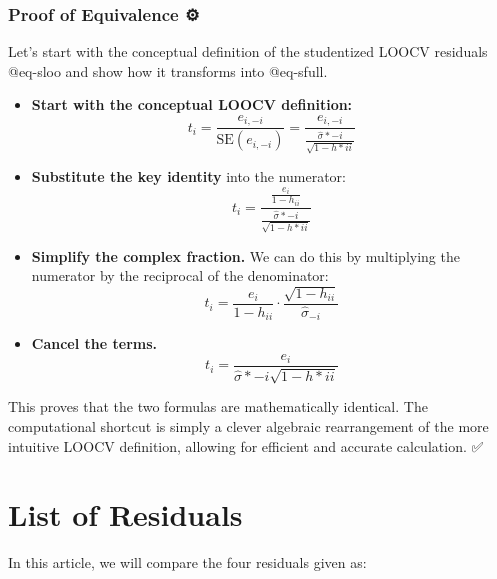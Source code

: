 \documentclass[
]{article}
\begin{document}
\subsubsection{Proof of Equivalence ⚙️}\label{proof-of-equivalence}

Let's start with the conceptual definition of the studentized LOOCV
residuals @eq-sloo and show how it transforms into @eq-sfull.

\begin{itemize}
\item
  \textbf{Start with the conceptual LOOCV definition:} \begin{equation}
  t_i = \frac{e_{i,-i}}{\text{SE}(e_{i,-i})} = \frac{e_{i,-i}}{\frac{\hat{\sigma}*{-i}}{\sqrt{1-h*{ii}}}}
  \end{equation}
\item
  \textbf{Substitute the key identity} into the numerator:
  \begin{equation}
  t_i = \frac{\frac{e_i}{1 - h_{ii}}}{\frac{\hat{\sigma}*{-i}}{\sqrt{1 - h*{ii}}}}
  \end{equation}
\item
  \textbf{Simplify the complex fraction.} We can do this by multiplying
  the numerator by the reciprocal of the denominator: \begin{equation}
  t_i = \frac{e_i}{1-h_{ii}} \cdot \frac{\sqrt{1-h_{ii}}}{\hat{\sigma}_{-i}}
  \end{equation}
\item
  \textbf{Cancel the terms.} \begin{equation}
  t_i = \frac{e_i}{\hat{\sigma}*{-i}\sqrt{1-h*{ii}}}
  \end{equation}
\end{itemize}

This proves that the two formulas are mathematically identical. The
computational shortcut is simply a clever algebraic rearrangement of the
more intuitive LOOCV definition, allowing for efficient and accurate
calculation. ✅

\section{List of Residuals}\label{list-of-residuals}

In this article, we will compare the four residuals given as:
\end{document}
